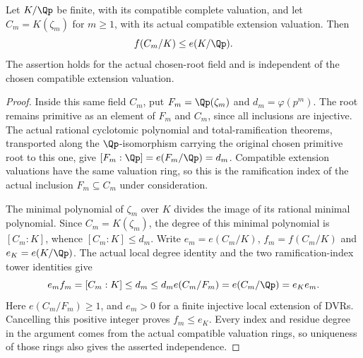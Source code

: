 \begin{lemma}
\label{ft:cyclotomic-finite-residue-bound}
\leanok
Let $K/\Qp$ be finite, with its compatible complete valuation,
and let $C_m=K(\zeta_m)$ for $m\geq1$, with its actual compatible
extension valuation. Then
\[
 f(C_m/K)\leq e(K/\Qp).
\]
The assertion holds for the actual chosen-root field and is
independent of the chosen compatible extension valuation.
\end{lemma}
\begin{proof}
Inside this same field $C_m$, put $F_m=\Qp(\zeta_m)$ and
$d_m=\varphi(p^m)$. The root remains primitive as an element of
$F_m$ and $C_m$, since all inclusions are injective. The actual
rational cyclotomic polynomial and total-ramification theorems,
transported along the $\Qp$-isomorphism carrying the original
chosen primitive root to this one, give
$[F_m:\Qp]=e(F_m/\Qp)=d_m$. Compatible extension valuations
have the same valuation ring, so this is the ramification index
of the actual inclusion $F_m\subseteq C_m$ under consideration.

The minimal polynomial of $\zeta_m$ over $K$ divides the image
of its rational minimal polynomial. Since $C_m=K(\zeta_m)$,
the degree of this minimal polynomial is $[C_m:K]$, whence
$[C_m:K]\leq d_m$.
Write $e_m=e(C_m/K)$, $f_m=f(C_m/K)$ and
$e_K=e(K/\Qp)$. The actual local degree identity and the two
ramification-index tower identities give
\[
 e_mf_m=[C_m:K]\leq d_m
 \leq d_m e(C_m/F_m)=e(C_m/\Qp)=e_K e_m.
\]
Here $e(C_m/F_m)\geq1$, and $e_m>0$ for a finite injective
local extension of DVRs. Cancelling this positive integer proves
$f_m\leq e_K$. Every index and residue degree in the argument
comes from the actual compatible valuation rings, so uniqueness
of those rings also gives the asserted independence.
\end{proof}

